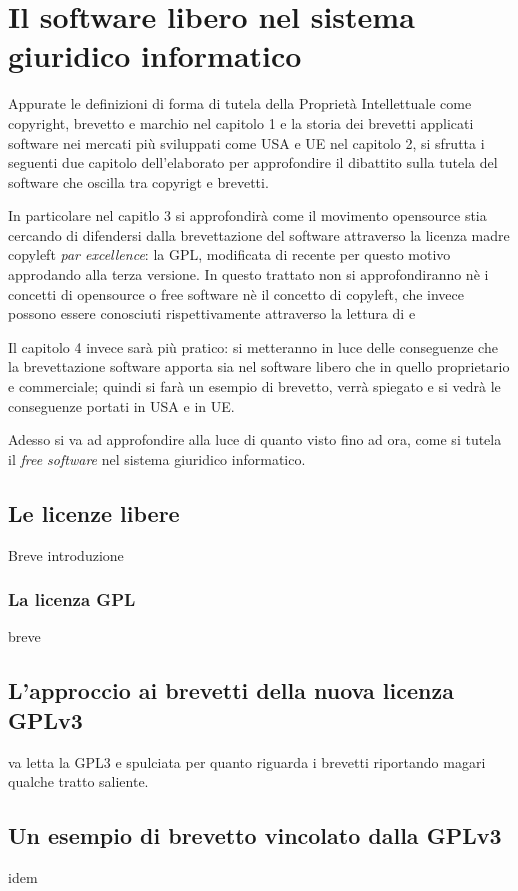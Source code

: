  \chapter{Il software libero nel sistema giuridico informatico}

Appurate le definizioni di forma di tutela della Proprietà Intellettuale come copyright, brevetto e marchio nel capitolo 1 e la storia dei brevetti applicati software nei mercati più sviluppati come USA e UE nel capitolo 2, si sfrutta i seguenti due capitolo dell'elaborato per approfondire il dibattito sulla tutela del software che oscilla tra copyrigt e brevetti.

In particolare nel capitlo 3 si approfondirà come il movimento opensource stia cercando di difendersi dalla brevettazione del software attraverso la licenza madre copyleft \textit{par excellence}: la GPL, modificata di recente per questo motivo approdando alla terza versione.
In questo trattato non si approfondiranno nè i concetti di opensource o free software nè il concetto di copyleft, che invece possono essere conosciuti rispettivamente attraverso la lettura di \cite[Compendio di libertà informatica e cultura open]{Aliprandi-compendio} e \cite[Copyleft e Opencontent]{Aliprandi-copyleft}

Il capitolo 4 invece sarà più pratico: si metteranno in luce delle conseguenze che la brevettazione software apporta sia nel software libero che in quello proprietario e commerciale; quindi si farà un esempio di brevetto, verrà spiegato e si vedrà le conseguenze portati in USA e in UE.

Adesso si va ad approfondire alla luce di quanto visto fino ad ora, come si tutela il \textit{free software} nel sistema giuridico informatico.


\section{Le licenze libere}
Breve introduzione
	\subsection{La licenza GPL}
	breve
\section{L'approccio ai brevetti della nuova licenza GPLv3}
va letta la GPL3 e spulciata per quanto riguarda i brevetti riportando magari qualche tratto saliente.
\section{Un esempio di brevetto vincolato dalla GPLv3}
idem

